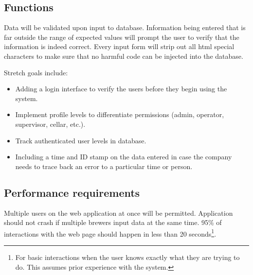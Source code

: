 \documentclass[draftclsnofoot,onecolumn,letterpaper,10pt,compsoc]{IEEEtran}
\begin{document}
	\subsection{Functions}

		Data will be validated upon input to database.
		Information being entered that is far outside the range of expected values will prompt the user to verify that the information is indeed correct.
		Every input form will strip out all html special characters to make sure that no harmful code can be injected into the database.

		Stretch goals include:
		\begin{itemize}
			\item{Adding a login interface to verify the users before they begin using the system.}
            
            \item{Implement profile levels to differentiate permissions (admin, operator, supervisor, cellar, etc.).}
            
            \item{Track authenticated user levels in database.}

			\item{Including a time and ID stamp on the data entered in case the company needs to trace back an error to a particular time or person.}
		\end{itemize}

	\subsection{Performance requirements}
		Multiple users on the web application at once will be permitted.
        Application should not crash if multiple brewers input data at the same time.
		95\% of interactions with the web page should happen in less than 20 seconds\footnote{For basic interactions when the user knows exactly what they are trying to do. This assumes prior experience with the system.}.
\end{document}
